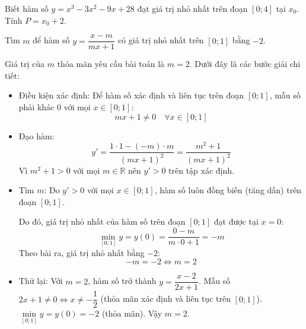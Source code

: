 \begin{baitap}
	Biết hàm số $y = x^3 - 3x^2 - 9x + 28$ đạt giá trị nhỏ nhất trên đoạn $[0; 4]$ tại $x_0$. Tính $P = x_0 + 2$.
	\begin{traloi}
	\end{traloi}
\end{baitap}

\begin{baitap}
	Tìm $m$ để hàm số $y = \dfrac{x - m}{mx + 1}$ có giá trị nhỏ nhất trên $[0; 1]$ bằng $-2$.
	\begin{traloi}
		\dapan{2}
		
		Giá trị của $m$ thỏa mãn yêu cầu bài toán là $m = 2$. Dưới đây là các bước giải chi tiết:
		\begin{itemize}
			\item Điều kiện xác định: Để hàm số xác định và liên tục trên đoạn $[0; 1]$, mẫu số phải khác $0$ với mọi $x \in [0; 1]$:$$mx + 1 \neq 0 \quad \forall x \in [0; 1]$$
			\item Đạo hàm: $$y' = \dfrac{1 \cdot 1 - (-m) \cdot m}{(mx + 1)^2} = \dfrac{m^2 + 1}{(mx + 1)^2}$$ Vì $m^2 + 1 > 0$ với mọi $m \in \mathbb{R}$ nên $y' > 0$ trên tập xác định.
			\item Tìm $m$: Do $y' > 0$ với mọi $x \in [0; 1]$, hàm số luôn đồng biến (tăng dần) trên đoạn $[0; 1]$. 
			
			Do đó, giá trị nhỏ nhất của hàm số trên đoạn $[0; 1]$ đạt được tại $x = 0$:$$\min\limits_{[0; 1]} y = y(0) = \dfrac{0 - m}{m \cdot 0 + 1} = -m$$ Theo bài ra, giá trị nhỏ nhất bằng $-2$:$$-m = -2 \iff m = 2$$
			\item Thử lại: Với $m = 2$, hàm số trở thành $y = \dfrac{x - 2}{2x + 1}$. Mẫu số $2x + 1 \neq 0 \iff x \neq -\dfrac{1}{2}$ (thỏa mãn xác định và liên tục trên $[0; 1]$).$\min\limits_{[0; 1]} y = y(0) = -2$ (thỏa mãn). Vậy $m = 2$.
		\end{itemize}
	\end{traloi}
\end{baitap}

